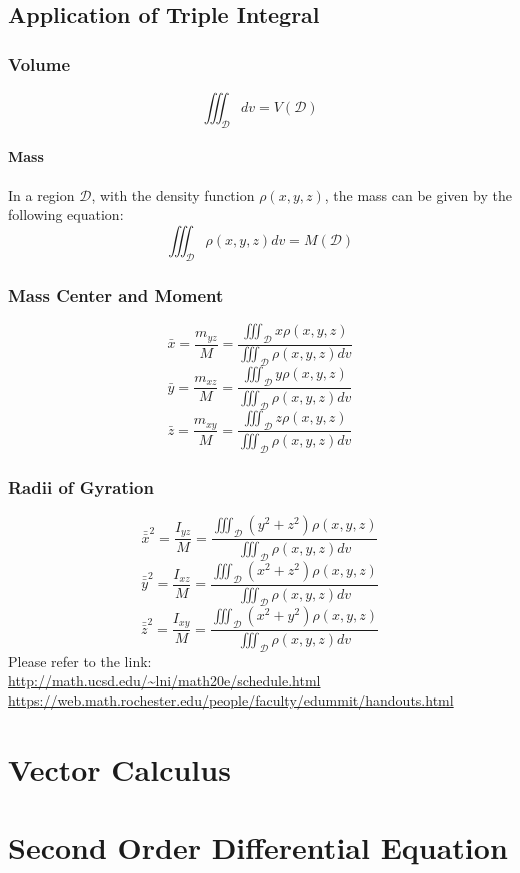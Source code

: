 \documentclass[UTF8,a4paper, 10pt, openany]{book}
\begin{document}
\section{Application of Triple Integral}
\subsection{Volume}
$$\iiint_{\mathcal{D}}dv=V(\mathcal{D})$$
\subsubsection{Mass}
In a region $\mathcal{D}$, with the density function $\rho (x,y,z)$, the mass can be given by the following equation:
$$\iiint_{\mathcal{D}}\rho (x,y,z)dv=M(\mathcal{D})$$
\subsection{Mass Center and Moment}
$$\bar{x}=\dfrac{m_{yz}}{M}=\dfrac{\displaystyle\iiint_{\mathcal{D}}x\rho(x,y,z)}{\displaystyle\iiint_{\mathcal{D}}\rho (x,y,z)dv}$$
$$\bar{y}=\dfrac{m_{xz}}{M}=\dfrac{\displaystyle\iiint_{\mathcal{D}}y\rho(x,y,z)}{\displaystyle\iiint_{\mathcal{D}}\rho (x,y,z)dv}$$
$$\bar{z}=\dfrac{m_{xy}}{M}=\dfrac{\displaystyle\iiint_{\mathcal{D}}z\rho(x,y,z)}{\displaystyle\iiint_{\mathcal{D}}\rho (x,y,z)dv}$$
\subsection{Radii of Gyration}
$$\bar{\bar{x}}^2=\dfrac{I_{yz}}{M}=\dfrac{\displaystyle\iiint_{\mathcal{D}}(y^2+z^2)\rho(x,y,z)}{\displaystyle\iiint_{\mathcal{D}}\rho (x,y,z)dv}$$
$$\bar{\bar{y}}^2=\dfrac{I_{xz}}{M}=\dfrac{\displaystyle\iiint_{\mathcal{D}}(x^2+z^2)\rho(x,y,z)}{\displaystyle\iiint_{\mathcal{D}}\rho (x,y,z)dv}$$
$$\bar{\bar{z}}^2=\dfrac{I_{xy}}{M}=\dfrac{\displaystyle\iiint_{\mathcal{D}}(x^2+y^2)\rho(x,y,z)}{\displaystyle\iiint_{\mathcal{D}}\rho (x,y,z)dv}$$
Please refer to the link:\\
\url{http://math.ucsd.edu/~lni/math20e/schedule.html}\\
\url{https://web.math.rochester.edu/people/faculty/edummit/handouts.html}
\chapter{Vector Calculus}
\chapter{Second Order Differential Equation}

\appendix %

\printnotes*
\end{document}
